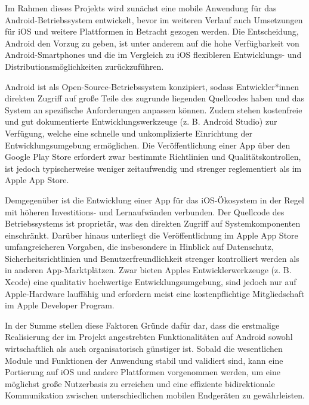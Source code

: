 \documentclass[a4paper, 12pt]{article} %
\begin{document}
\begin{spacing}{1.8}  %
\fontsize{14pt}{15pt}\selectfont  %

Im Rahmen dieses Projekts wird zunächst eine mobile Anwendung für das Android-Betriebssystem entwickelt, bevor im weiteren Verlauf auch Umsetzungen für iOS und weitere Plattformen in Betracht gezogen werden. Die Entscheidung, Android den Vorzug zu geben, ist unter anderem auf die hohe Verfügbarkeit von Android-Smartphones und die im Vergleich zu iOS flexibleren Entwicklungs- und Distributionsmöglichkeiten zurückzuführen.

Android ist als Open-Source-Betriebssystem konzipiert, sodass Entwickler*innen 
direkten Zugriff auf große Teile des zugrunde liegenden Quellcodes haben und das System an spezifische Anforderungen anpassen können. Zudem stehen kostenfreie und gut dokumentierte Entwicklungswerkzeuge (z. B. Android Studio) zur Verfügung, welche eine schnelle und unkomplizierte Einrichtung der Entwicklungsumgebung ermöglichen. Die Veröffentlichung einer App über den Google Play Store erfordert zwar bestimmte Richtlinien 
und Qualitätskontrollen, ist jedoch typischerweise weniger zeitaufwendig und strenger reglementiert als im Apple App Store.

Demgegenüber ist die Entwicklung einer App für das iOS-Ökosystem in der 
Regel mit höheren Investitions- und Lernaufwänden verbunden. Der Quellcode des Betriebssystems ist proprietär, was den direkten Zugriff auf Systemkomponenten einschränkt. Darüber hinaus unterliegt die Veröffentlichung im Apple App Store umfangreicheren Vorgaben, die insbesondere in Hinblick auf Datenschutz, Sicherheitsrichtlinien und Benutzerfreundlichkeit strenger kontrolliert werden als in anderen App-Marktplätzen. Zwar bieten Apples Entwicklerwerkzeuge (z. B. Xcode) eine qualitativ hochwertige Entwicklungsumgebung, sind jedoch nur auf Apple-Hardware lauffähig und erfordern meist eine kostenpflichtige Mitgliedschaft im Apple Developer Program.

In der Summe stellen diese Faktoren Gründe dafür dar, dass 
die erstmalige Realisierung der im Projekt angestrebten Funktionalitäten auf 
Android sowohl wirtschaftlich als auch organisatorisch günstiger ist. Sobald die wesentlichen Module und Funktionen der Anwendung stabil und validiert sind, kann eine Portierung auf iOS und andere Plattformen vorgenommen werden, um eine möglichst große Nutzerbasis zu erreichen und eine effiziente bidirektionale Kommunikation zwischen unterschiedlichen mobilen Endgeräten zu gewährleisten.

\end{spacing}
\end{document}
